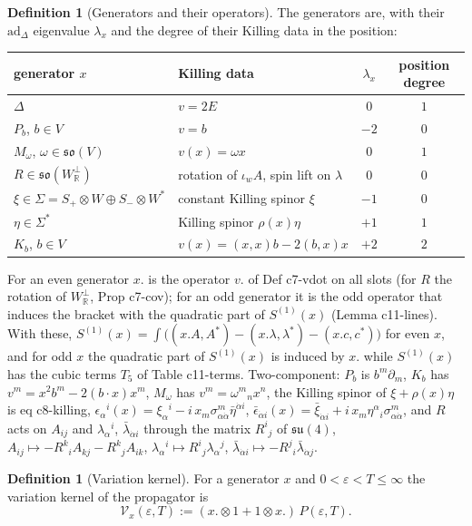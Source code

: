 \documentclass[11pt]{article}
\numberwithin{equation}{section}
\theoremstyle{plain}
\theoremstyle{definition}
\newtheorem{definition}[theorem]{Definition}
\newcommand{\Var}{\mathcal V}
\begin{document}
\begin{definition}[Generators and their operators]
\label{def:op-gens}
The generators are, with their $\mathrm{ad}_\Delta$ eigenvalue $\lambda_x$ and the degree of their Killing data in the position:
\begin{center}
\begin{tabular}{l|l|c|c}
generator $x$ & Killing data & $\lambda_x$ & position degree\\
\hline
$\Delta$ & $v=2E$ & $0$ & $1$\\
$P_b$, $b\in V$ & $v=b$ & $-2$ & $0$\\
$M_\omega$, $\omega\in\mathfrak{so}(V)$ & $v(x)=\omega x$ & $0$ & $1$\\
$R\in\mathfrak{so}(W_{\mathbb R}^\perp)$ & rotation of $\iota_wA$, spin lift on $\lambda$ & $0$ & $0$\\
$\xi\in\Sigma=S_+\otimes W\oplus S_-\otimes W^*$ & constant Killing spinor $\xi$ & $-1$ & $0$\\
$\eta\in\Sigma^*$ & Killing spinor $\rho(x)\eta$ & $+1$ & $1$\\
$K_b$, $b\in V$ & $v(x)=(x,x)b-2(b,x)x$ & $+2$ & $2$
\end{tabular}
\end{center}
For an even generator $x.$ is the operator $v.$ of Def c7-vdot on all slots (for $R$ the rotation of $W_{\mathbb R}^\perp$, Prop c7-cov); for an odd generator it is the odd operator that induces the bracket with the quadratic part of $S^{(1)}(x)$ (Lemma c11-lines). With these, $S^{(1)}(x)=\int\big((x.A,A^*)-(x.\lambda,\lambda^*)-(x.c,c^*)\big)$ for even $x$, and for odd $x$ the quadratic part of $S^{(1)}(x)$ is induced by $x.$ while $S^{(1)}(x)$ has the cubic terms $T_5$ of Table c11-terms. Two-component: $P_b$ is $b^m\partial_m$, $K_b$ has $v^m=x^2b^m-2(b\cdot x)x^m$, $M_\omega$ has $v^m=\omega^m{}_nx^n$, the Killing spinor of $\xi+\rho(x)\eta$ is eq c8-killing, $\epsilon_\alpha{}^i(x)=\xi_\alpha{}^i-i\,x_m\sigma^m_{\alpha\dot\alpha}\bar\eta^{\dot\alpha i}$, $\bar\epsilon_{\dot\alpha i}(x)=\bar\xi_{\dot\alpha i}+i\,x_m\eta^\alpha{}_i\sigma^m_{\alpha\dot\alpha}$, and $R$ acts on $A_{ij}$ and $\lambda_\alpha{}^i$, $\bar\lambda_{\dot\alpha i}$ through the matrix $R^i{}_j$ of $\mathfrak{su}(4)$, $A_{ij}\mapsto-R^k{}_iA_{kj}-R^k{}_jA_{ik}$, $\lambda_\alpha{}^i\mapsto R^i{}_j\lambda_\alpha{}^j$, $\bar\lambda_{\dot\alpha i}\mapsto-R^j{}_i\bar\lambda_{\dot\alpha j}$.
\end{definition}

\begin{definition}[Variation kernel]
\label{def:op-var}
For a generator $x$ and $0<\varepsilon<T\le\infty$ the variation kernel of the propagator is
\[
\Var_x(\varepsilon,T):=(x.\otimes1+1\otimes x.)\,P(\varepsilon,T).
\]
\end{definition}
\end{document}

